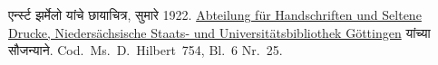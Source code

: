 एर्न्स्ट झर्मेलो यांचे छायाचित्र, सुमारे 1922.
\href{https://www.sub.uni-goettingen.de/en/collections/erkunden/handschriften}{Abteilung
für Handschriften und Seltene Drucke, Niedersächsische Staats- und
Universitätsbibliothek Göttingen} यांच्या सौजन्याने. Cod.\ Ms.\
D.~Hilbert~754, Bl.~6 Nr.~25.
